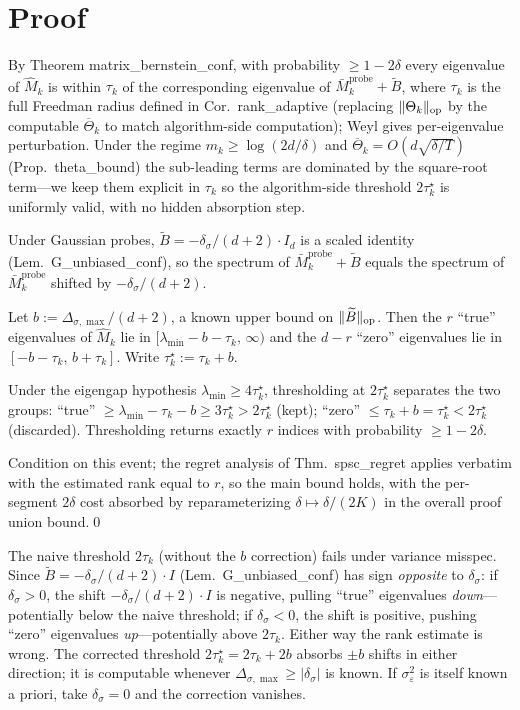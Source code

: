 \section*{Proof}

By Theorem matrix\_bernstein\_conf, with probability $\ge 1-2\delta$
every eigenvalue of $\widehat M_k$ is within $\tau_k$ of the
corresponding eigenvalue of $\bar M_k^{\mathrm{probe}}+\widetilde B$,
where $\tau_k$ is the full Freedman radius defined in
Cor.\ rank\_adaptive (replacing $\|\Theta_k\|_{\mathrm{op}}$ by the computable
$\overline\Theta_k$ to match algorithm-side computation); Weyl gives
per-eigenvalue perturbation. Under the regime $m_k\ge\log(2d/\delta)$
and $\overline\Theta_k=O(d\sqrt{\delta/T})$ (Prop.\ theta\_bound) the
sub-leading terms are dominated by the square-root term---we keep them
explicit in $\tau_k$ so the algorithm-side threshold $2\tau_k^\star$
is uniformly valid, with no hidden absorption step.

Under Gaussian probes, $\widetilde B = -\delta_\sigma/(d+2)\cdot I_d$ is
a scaled identity (Lem.\ G\_unbiased\_conf), so the spectrum of
$\bar M_k^{\mathrm{probe}}+\widetilde B$ equals the spectrum of
$\bar M_k^{\mathrm{probe}}$ shifted by $-\delta_\sigma/(d+2)$.

Let $b:=\Delta_{\sigma,\max}/(d+2)$, a known upper bound on
$\|\widetilde B\|_{\mathrm{op}}$. Then the $r$ ``true'' eigenvalues of $\widehat M_k$
lie in $[\lambda_{\min}-b-\tau_k,\,\infty)$ and the $d-r$ ``zero''
eigenvalues lie in $[-b-\tau_k,\,b+\tau_k]$. Write
$\tau_k^\star := \tau_k+b$.

Under the eigengap hypothesis $\lambda_{\min}\ge 4\tau_k^\star$,
thresholding at $2\tau_k^\star$ separates the two groups:
``true'' $\ge\lambda_{\min}-\tau_k-b\ge 3\tau_k^\star > 2\tau_k^\star$
(kept); ``zero'' $\le\tau_k+b = \tau_k^\star < 2\tau_k^\star$
(discarded). Thresholding returns exactly $r$ indices with
probability $\ge 1-2\delta$.

Condition on this event; the regret analysis of Thm.\ spsc\_regret
applies verbatim with the estimated rank equal to $r$, so the main
bound holds, with the per-segment $2\delta$ cost absorbed by
reparameterizing $\delta\mapsto\delta/(2K)$ in the overall proof
union bound.\qed

\begin{remark}
\label{rem:shift_correction}
The naive threshold $2\tau_k$ (without the $b$ correction) fails
under variance misspec. Since $\widetilde B = -\delta_\sigma/(d+2)\cdot I$
(Lem.\ G\_unbiased\_conf) has sign \emph{opposite} to $\delta_\sigma$:
if $\delta_\sigma > 0$, the shift $-\delta_\sigma/(d+2)\cdot I$ is
negative, pulling ``true'' eigenvalues \emph{down}---potentially
below the naive threshold; if $\delta_\sigma < 0$, the shift is
positive, pushing ``zero'' eigenvalues \emph{up}---potentially above
$2\tau_k$. Either way the rank estimate is wrong. The corrected
threshold $2\tau_k^\star = 2\tau_k+2b$ absorbs $\pm b$ shifts in
either direction; it is computable whenever $\Delta_{\sigma,\max}\ge|\delta_\sigma|$
is known. If $\sigma_\varepsilon^2$ is itself known a priori, take
$\delta_\sigma=0$ and the correction vanishes.
\end{remark}


